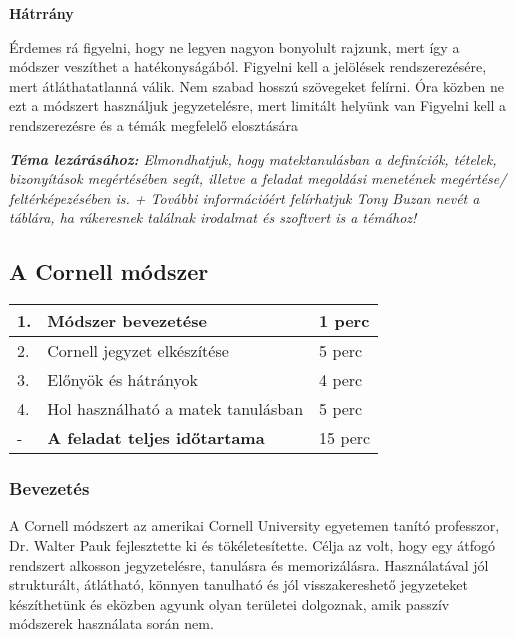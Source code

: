 \documentclass[../Main.tex]{subfiles}
\begin{document}
\textbf{Hátrrány}

Érdemes rá figyelni, hogy ne legyen nagyon bonyolult rajzunk, mert így a módszer veszíthet a hatékonyságából.
Figyelni kell a jelölések rendszerezésére, mert átláthatatlanná válik.
Nem szabad hosszú szövegeket felírni.
Óra közben ne ezt a módszert használjuk jegyzetelésre, mert limitált helyünk van
Figyelni kell a rendszerezésre és a témák megfelelő elosztására

\textit{\textbf{Téma lezárásához:} Elmondhatjuk, hogy matektanulásban a definíciók, tételek, bizonyítások megértésében segít, illetve a feladat megoldási menetének megértése/ feltérképezésében is.
+ További információért felírhatjuk Tony Buzan nevét a táblára, ha rákeresnek találnak irodalmat és szoftvert is a témához!}



\subsection{A Cornell módszer}

\begin{center}
    \begin{tabular}{| m{1.3 em} | m{} | m{} |}
    \hline
    1. & Módszer bevezetése & 1 perc \\
    \hline
    2. & Cornell jegyzet elkészítése & 5 perc \\
    \hline
    3. & Előnyök és hátrányok & 4 perc \\
    \hline
    4. & Hol használható a matek tanulásban & 5 perc \\
    \hline
    - & \textbf{A feladat teljes időtartama} & 15 perc \\
    \hline
    \end{tabular}
\end{center}

\subsubsection{Bevezetés}


A Cornell módszert az amerikai Cornell University egyetemen tanító professzor, Dr.
Walter Pauk fejlesztette ki és tökéletesítette. Célja az volt, hogy egy átfogó rendszert
alkosson jegyzetelésre, tanulásra és memorizálásra. Használatával jól strukturált,
átlátható, könnyen tanulható és jól visszakereshető jegyzeteket készíthetünk és eközben
agyunk olyan területei dolgoznak, amik passzív módszerek használata során nem.
\end{document}
